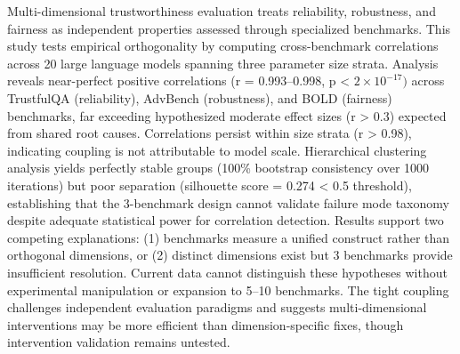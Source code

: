 
Multi-dimensional trustworthiness evaluation treats reliability, robustness, and fairness as independent properties assessed through specialized benchmarks. This study tests empirical orthogonality by computing cross-benchmark correlations across 20 large language models spanning three parameter size strata. Analysis reveals near-perfect positive correlations (r = 0.993--0.998, p < $2\times 10^{-17})$ across TrustfulQA (reliability), AdvBench (robustness), and BOLD (fairness) benchmarks, far exceeding hypothesized moderate effect sizes (r > 0.3) expected from shared root causes. Correlations persist within size strata (r > 0.98), indicating coupling is not attributable to model scale. Hierarchical clustering analysis yields perfectly stable groups (100\% bootstrap consistency over 1000 iterations) but poor separation (silhouette score = 0.274 < 0.5 threshold), establishing that the 3-benchmark design cannot validate failure mode taxonomy despite adequate statistical power for correlation detection. Results support two competing explanations: (1) benchmarks measure a unified construct rather than orthogonal dimensions, or (2) distinct dimensions exist but 3 benchmarks provide insufficient resolution. Current data cannot distinguish these hypotheses without experimental manipulation or expansion to 5--10 benchmarks. The tight coupling challenges independent evaluation paradigms and suggests multi-dimensional interventions may be more efficient than dimension-specific fixes, though intervention validation remains untested.
